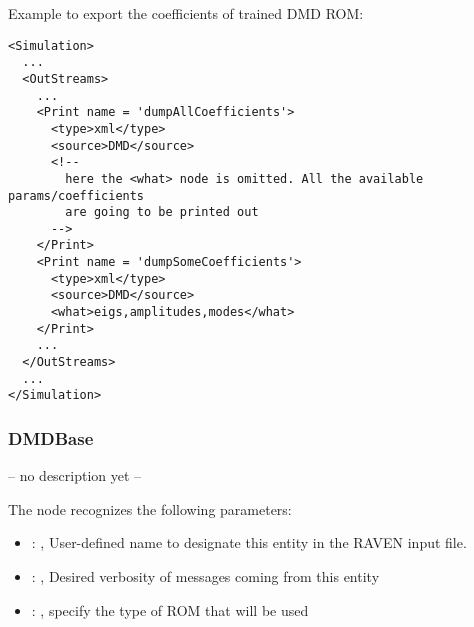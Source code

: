 Example to export the coefficients of trained DMD ROM:
\begin{lstlisting}[style=XML,morekeywords={name,subType}]
<Simulation>
  ...
  <OutStreams>
    ...
    <Print name = 'dumpAllCoefficients'>
      <type>xml</type>
      <source>DMD</source>
      <!--
        here the <what> node is omitted. All the available params/coefficients
        are going to be printed out
      -->
    </Print>
    <Print name = 'dumpSomeCoefficients'>
      <type>xml</type>
      <source>DMD</source>
      <what>eigs,amplitudes,modes</what>
    </Print>
    ...
  </OutStreams>
  ...
</Simulation>
\end{lstlisting}


\subsubsection{DMDBase}
  -- no description yet --

  The  node recognizes the following parameters:
    \begin{itemize}
      \item {}: , 
        User-defined name to designate this entity in the RAVEN input file.
      \item {}: , 
        Desired verbosity of messages coming from this entity
      \item {}: , 
        specify the type of ROM that will be used
  \end{itemize}

